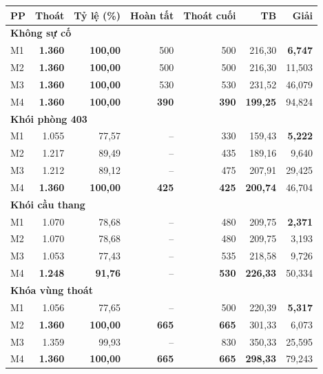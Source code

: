 \small\setlength{\tabcolsep}{3pt}\begin{tabular}{lrrrrrr}
\toprule
PP & Thoát & Tỷ lệ (\%) & Hoàn tất & Thoát cuối & TB & Giải\\\midrule
\multicolumn{7}{l}{\textbf{Không sự cố}}\\
M1 & \textbf{1.360} & \textbf{100,00} & 500 & 500 & 216,30 & \textbf{6,747}\\
M2 & \textbf{1.360} & \textbf{100,00} & 500 & 500 & 216,30 & 11,503\\
M3 & \textbf{1.360} & \textbf{100,00} & 530 & 530 & 231,52 & 46,079\\
M4 & \textbf{1.360} & \textbf{100,00} & \textbf{390} & \textbf{390} & \textbf{199,25} & 94,824\\
\midrule
\multicolumn{7}{l}{\textbf{Khói phòng 403}}\\
M1 & 1.055 & 77,57 & -- & 330 & 159,43 & \textbf{5,222}\\
M2 & 1.217 & 89,49 & -- & 435 & 189,16 & 9,640\\
M3 & 1.212 & 89,12 & -- & 475 & 207,91 & 29,425\\
M4 & \textbf{1.360} & \textbf{100,00} & \textbf{425} & \textbf{425} & \textbf{200,74} & 46,704\\
\midrule
\multicolumn{7}{l}{\textbf{Khói cầu thang}}\\
M1 & 1.070 & 78,68 & -- & 480 & 209,75 & \textbf{2,371}\\
M2 & 1.070 & 78,68 & -- & 480 & 209,75 & 3,193\\
M3 & 1.053 & 77,43 & -- & 535 & 218,58 & 9,726\\
M4 & \textbf{1.248} & \textbf{91,76} & -- & \textbf{530} & \textbf{226,33} & 50,334\\
\midrule
\multicolumn{7}{l}{\textbf{Khóa vùng thoát}}\\
M1 & 1.056 & 77,65 & -- & 500 & 220,39 & \textbf{5,317}\\
M2 & \textbf{1.360} & \textbf{100,00} & \textbf{665} & \textbf{665} & 301,33 & 6,073\\
M3 & 1.359 & 99,93 & -- & 830 & 350,33 & 25,595\\
M4 & \textbf{1.360} & \textbf{100,00} & \textbf{665} & \textbf{665} & \textbf{298,33} & 79,243\\
\midrule
\end{tabular}